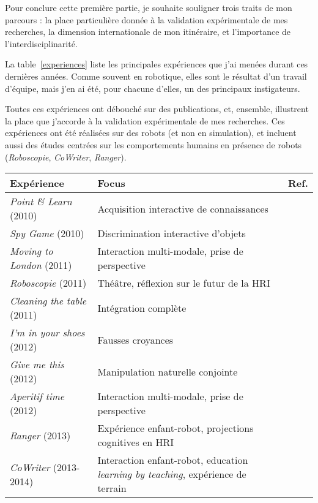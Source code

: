 \documentclass[a4paper]{article}
\begin{document}
Pour conclure cette première partie, je souhaite souligner trois traits de mon
parcours : la place particulière donnée à la validation expérimentale de mes
recherches, la dimension internationale de mon itinéraire, et l'importance de
l'interdisciplinarité.

La table~\ref{experiences} liste les principales expériences que j'ai menées
durant ces dernières années. Comme souvent en robotique, elles sont le résultat
d'un travail d'équipe, mais j'en ai été, pour chacune d'elles, un des
principaux instigateurs.

Toutes ces expériences ont débouché sur des publications, et, ensemble, illustrent la place que
j'accorde à la validation expérimentale de mes recherches. Ces expériences ont
été réalisées sur des robots (et non en simulation), et incluent aussi des
études centrées sur les comportements humains en présence de robots
(\emph{Roboscopie}, \emph{CoWriter}, \emph{Ranger}).

\begin{table*}
\begin{center}

    \begin{tabular}{lp{6cm}l}
\bf{Expérience} & Focus & Ref. \\
\hline
{\it Point \& Learn} (2010) & Acquisition interactive de connaissances &
\cite{lemaignan2010oro} \\
{\it Spy Game} (2010) & Discrimination interactive d'objets & \cite{ros2010which} \\
{\it Moving to London} (2011) & Interaction multi-modale, \newline prise de perspective & \cite{lemaignan2011what} \\
{\it Roboscopie} (2011) & Théâtre, \newline réflexion sur le futur de la HRI & \cite{lemaignan2012roboscopie} \\
{\it Cleaning the table} (2011) & Intégration complète & \cite{alami2011when} \\
{\it I'm in your shoes} (2012) & Fausses croyances & \cite{warnier2012when} \\
{\it Give me this} (2012) & Manipulation naturelle conjointe & \cite{gharbi2013natural} \\
{\it Aperitif time} (2012) & Interaction multi-modale, \newline prise de perspective & \cite{lemaignan2013talking} \\
{\it Ranger} (2013) & Expérience enfant-robot, \newline projections cognitives en HRI & \cite{fink2014which, lemaignan2014dynamics} \\
{\it CoWriter} (2013-2014) & Interaction enfant-robot, education \newline \emph{learning by teaching}, expérience de terrain & \cite{hood2015when,lemaignan2014taught, hood2015cowriter} \\
\hline

\end{tabular}
\end{center}
\caption{Principales expériences menées en interaction homme-robot.}
\label{experiences}
\end{table*}
\end{document}
